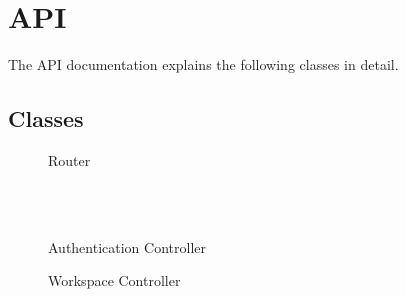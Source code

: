 \section{API}
The API documentation explains the following classes in detail.
\subsection{Classes}
\begin{figure}[hb]
    \centering
    \caption{Router}
    \label{fig:router-class}
\end{figure}
~\\
~\\
\begin{figure}[!htb]
    \centering
    \caption{Authentication Controller}
    \label{fig:auth-controller}
\end{figure}
\newpage
\begin{figure}[!htb]
    \centering
    \caption{Workspace Controller}
    \label{fig:workspace-controller}
\end{figure}

